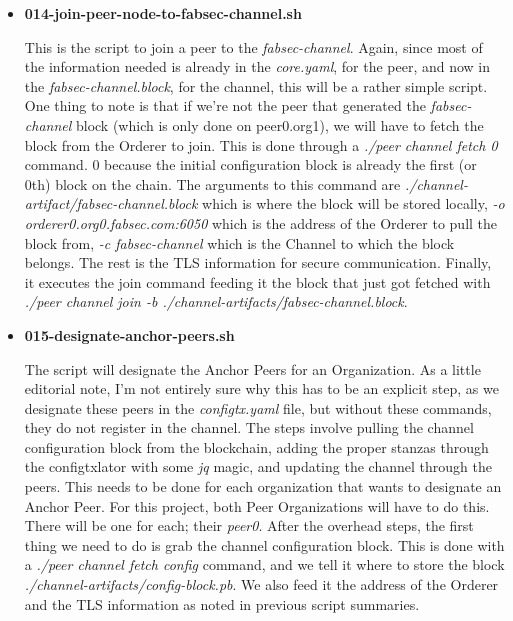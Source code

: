 \begin{itemize}
				\item \textbf{014-join-peer-node-to-fabsec-channel.sh}
					
					\hspace{10mm}This is the script to join a peer to the \textit{fabsec-channel}. Again, since most of the information needed is already in the \textit{core.yaml}, for the peer, and now in the \textit{fabsec-channel.block}, for the channel, this will be a rather simple script. One thing to note is that if we're not the peer that generated the \textit{fabsec-channel} block (which is only done on peer0.org1), we will have to fetch the block from the Orderer to join. This is done through a \textit{./peer channel fetch 0} command. 0 because the initial configuration block is already the first (or 0th) block on the chain. The arguments to this command are \textit{./channel-artifact/fabsec-channel.block} which is where the block will be stored locally, \textit{-o orderer0.org0.fabsec.com:6050} which is the address of the Orderer to pull the block from, \textit{-c fabsec-channel} which is the Channel to which the block belongs. The rest is the TLS information for secure communication. Finally, it executes the join command feeding it the block that just got fetched with \textit{./peer channel join -b ./channel-artifacts/fabsec-channel.block}.
					
				\item \textbf{015-designate-anchor-peers.sh}
				
					\hspace{10mm}The script will designate the Anchor Peers for an Organization. As a little editorial note, I'm not entirely sure why this has to be an explicit step, as we designate these peers in the \textit{configtx.yaml} file, but without these commands, they do not register in the channel. The steps involve pulling the channel configuration block from the blockchain, adding the proper stanzas through the configtxlator with some \textit{jq} magic, and updating the channel through the peers. This needs to be done for each organization that wants to designate an Anchor Peer. For this project, both Peer Organizations will have to do this. There will be one for each; their \textit{peer0}. After the overhead steps, the first thing we need to do is grab the channel configuration block. This is done with a \textit{./peer channel fetch config} command, and we tell it where to store the block \textit{./channel-artifacts/config-block.pb}. We also feed it the address of the Orderer and the TLS information as noted in previous script summaries.\\
					

\end{itemize}
